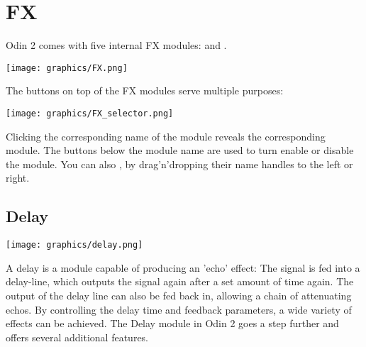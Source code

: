 \chapter{FX}
\label{FX}
Odin 2 comes with five internal FX modules:  and .

\begin{center}
    \texttt{[image: graphics/FX.png]}
\end{center}

The buttons on top of the FX modules serve multiple purposes:

\begin{center}
    \texttt{[image: graphics/FX\_selector.png]}
\end{center}

Clicking the corresponding name of the module reveals the corresponding module. The buttons below the module name are used to turn enable or disable the module.
You can also , by drag'n'dropping their name handles to the left or right.



\section{Delay}
\label{delay}
\begin{center}
    \texttt{[image: graphics/delay.png]}
\end{center}

A delay is a module capable of producing an 'echo' effect: The signal is fed into a delay-line, which outputs the signal again after a set amount of time again. The output of the delay line can also be fed back in, allowing a chain of attenuating echos. By controlling the delay time and feedback parameters, a wide variety of effects can be achieved. The Delay module in Odin 2 goes a step further and offers several additional features.


